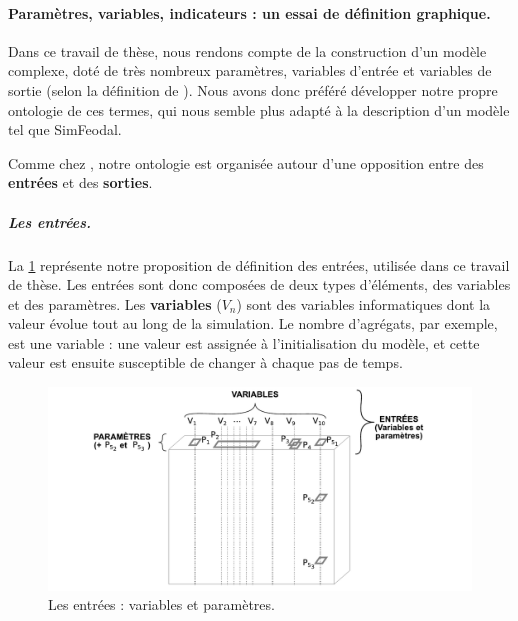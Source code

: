 \paragraph{Paramètres, variables, indicateurs : un essai de définition graphique.}\label{subsubsec:mes_definitions_params}

Dans ce travail de thèse, nous rendons compte de la construction d'un modèle complexe, doté de très nombreux paramètres, variables d'entrée et variables de sortie (selon la définition de \citeauthor{balci_validation_1994}).
Nous avons donc préféré développer notre propre \og ontologie\fg{} de ces termes, qui nous semble plus adapté à la description d'un modèle tel que SimFeodal.

Comme chez \citeauthor{balci_validation_1994}, notre ontologie est organisée autour d'une opposition entre des \textbf{entrées} et des \textbf{sorties}.

\subparagraph{Les entrées.}
La \cref{fig:parametres-these-entrees} représente notre proposition de définition des entrées, utilisée dans ce travail de thèse.
Les entrées sont donc composées de deux types d'éléments, des variables et des paramètres.
Les \textbf{variables} ($V_n$) sont des variables informatiques dont la valeur évolue tout au long de la simulation.
Le nombre d'agrégats, par exemple, est une variable : une valeur est assignée à l'initialisation du modèle, et cette valeur est ensuite susceptible de changer à chaque pas de temps.

\begin{figure}[H]
	\includegraphics[width=\linewidth]{img/schemas_params_1_entrees.pdf}
	\caption{Les entrées : variables et paramètres.} 
	\label{fig:parametres-these-entrees} 
\end{figure}

